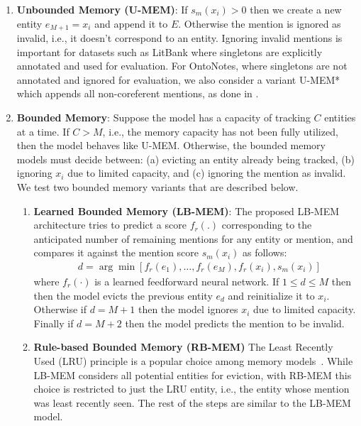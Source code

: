 \documentclass[11pt,a4paper]{article}
\newcommand{\unbounded}{U-MEM\xspace}
\newcommand{\learned}{LB-MEM\xspace}
\newcommand{\lru}{RB-MEM\xspace}
\begin{document}
\begin{enumerate}[wide, labelwidth=!, labelindent=0pt]
    \item \textbf{Unbounded Memory (\unbounded)}: If $s_m(x_i) > 0$ then we create a new entity $e_{M + 1} = x_i$ and append it to $E$.
    Otherwise the mention is ignored as invalid, i.e., it doesn't correspond to an entity.
    Ignoring invalid mentions is important for datasets such as LitBank where singletons are explicitly annotated and used for evaluation.
    For OntoNotes, where singletons are not annotated and ignored for evaluation, we also consider a variant U-MEM* which appends all non-coreferent mentions, as done in \citet{xia2020revisiting}.
    

    \item \textbf{Bounded Memory}: Suppose the model has a capacity of tracking $C$ entities at a time.
    If $C > M$, i.e., the memory capacity has not been fully utilized, then the model behaves like U-MEM. Otherwise, the bounded memory models must decide between: (a) evicting an entity already being tracked, (b) ignoring $x_i$ due to limited capacity, and (c) ignoring the mention as invalid.
    We test two bounded memory variants that are described below.

    \begin{enumerate}[wide, labelwidth=!, labelindent=0pt]
        \item \textbf{Learned Bounded Memory (\learned)}:
        The proposed \learned architecture tries to predict a score $f_r(.)$ corresponding to the anticipated number of remaining mentions for any entity or mention, and compares it against the mention score $s_m(x_i)$ as follows:
        \begin{align*}
            &d = \arg\min [f_r(e_1), \dotsc, f_r(e_M), f_r(x_i), s_m(x_i)]
        \end{align*}
        where $f_r(\cdot)$ is a learned feedforward neural network. If $1 \le d \le M$ then then the model evicts the previous entity $e_d$ and reinitialize it to $x_i$.
        Otherwise if $d = M + 1$ then the model ignores $x_i$ due to limited capacity.
        Finally if $d = M + 2$ then the model predicts the mention to be invalid.
        \item \textbf{Rule-based Bounded Memory (\lru)}
        The Least Recently Used (LRU) principle is a popular choice among memory models~\citep{rae2016scaling, santoro2016one}.
        While \learned  considers all potential entities for eviction, with \lru  this choice is restricted to just the LRU entity, i.e., the entity whose mention was least recently seen.
        The rest of the steps are similar to the \learned model.
    \end{enumerate}
\end{enumerate}
 
\end{document}
